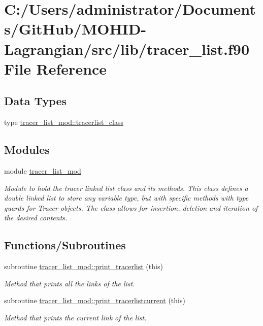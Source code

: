 \hypertarget{tracer__list_8f90}{}\section{C\+:/\+Users/administrator/\+Documents/\+Git\+Hub/\+M\+O\+H\+I\+D-\/\+Lagrangian/src/lib/tracer\+\_\+list.f90 File Reference}
\label{tracer__list_8f90}
\subsection*{Data Types}
\begin{DoxyCompactItemize}
\item 
type \mbox{\hyperlink{structtracer__list__mod_1_1tracerlist__class}{tracer\+\_\+list\+\_\+mod\+::tracerlist\+\_\+class}}
\end{DoxyCompactItemize}
\subsection*{Modules}
\begin{DoxyCompactItemize}
\item 
module \mbox{\hyperlink{namespacetracer__list__mod}{tracer\+\_\+list\+\_\+mod}}
\begin{DoxyCompactList}\small\item\em Module to hold the tracer linked list class and its methods. This class defines a double linked list to store any variable type, but with specific methods with type guards for Tracer objects. The class allows for insertion, deletion and iteration of the desired contents. \end{DoxyCompactList}\end{DoxyCompactItemize}
\subsection*{Functions/\+Subroutines}
\begin{DoxyCompactItemize}
\item 
subroutine \mbox{\hyperlink{namespacetracer__list__mod_a53919fa88a10347294eb6f2fccf072c7}{tracer\+\_\+list\+\_\+mod\+::print\+\_\+tracerlist}} (this)
\begin{DoxyCompactList}\small\item\em Method that prints all the links of the list. \end{DoxyCompactList}\item 
subroutine \mbox{\hyperlink{namespacetracer__list__mod_a8c123eab5e919438e71cfc0b3847d384}{tracer\+\_\+list\+\_\+mod\+::print\+\_\+tracerlistcurrent}} (this)
\begin{DoxyCompactList}\small\item\em Method that prints the current link of the list. \end{DoxyCompactList}\end{DoxyCompactItemize}

